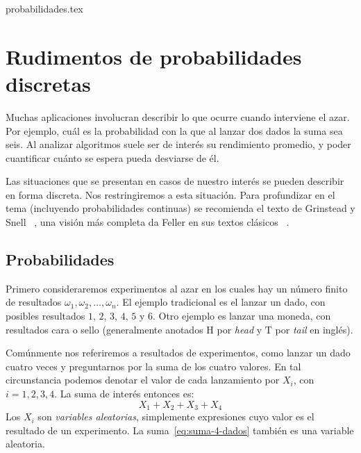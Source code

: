  probabilidades.tex
%

\chapter{Rudimentos de probabilidades discretas}
\label{cha:probabilidad-discreta}

  Muchas aplicaciones involucran describir lo que ocurre
  cuando interviene el azar.
  Por ejemplo,
  cuál es la probabilidad
  con la que al lanzar dos dados la suma sea seis.
  Al analizar algoritmos
  suele ser de interés su rendimiento promedio,
  y poder cuantificar cuánto se espera pueda desviarse de él.

  Las situaciones que se presentan en casos de nuestro interés
  se pueden describir en forma discreta.
  Nos restringiremos a esta situación.
  Para profundizar en el tema
  (incluyendo probabilidades continuas)
  se recomienda el texto de Grinstead y Snell~%
    \cite{grinstead97:_introd_probab},
  una visión más completa da Feller en sus textos clásicos~%
    \cite{feller68:_intro_probab_theo_applic_1,
	  feller71:_intro_probab_theo_applic_2}.

\section{Probabilidades}
\label{sec:probabilidades}

  Primero consideraremos experimentos al azar
  en los cuales hay un número finito de resultados
  \(\omega_1, \omega_2, \dotsc, \omega_n\).
  El ejemplo tradicional es el lanzar un dado,
  con posibles resultados
    \(1\), \(2\), \(3\), \(4\), \(5\) y \(6\).
  Otro ejemplo es lanzar una moneda,
  con resultados cara o sello
  (generalmente anotados \(\mathrm{H}\)
   por \emph{\foreignlanguage{english}{head}}
   y \(\mathrm{T}\)
   por \emph{\foreignlanguage{english}{tail}} en inglés).

  Comúnmente nos referiremos a resultados de experimentos,
  como lanzar un dado cuatro veces
  y preguntarnos por la suma de los cuatro valores.
  En tal circunstancia podemos denotar el valor de cada lanzamiento
  por \(X_i\),
  con \(i = 1, 2, 3, 4\).
  La suma de interés entonces es:
  \begin{equation}
    \label{eq:suma-4-dados}
    X_1 + X_2 + X_3 + X_4
  \end{equation}
  Los \(X_i\) son \emph{variables aleatorias},%
  simplemente expresiones
  cuyo valor es el resultado de un experimento.
  La suma~\eqref{eq:suma-4-dados} también es una variable aleatoria.

